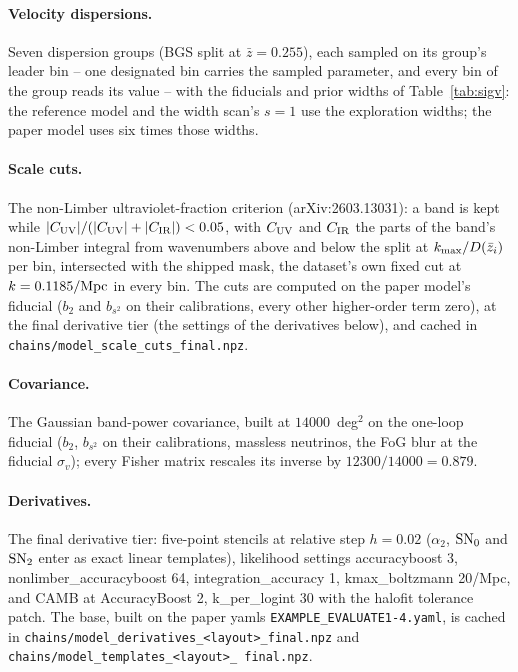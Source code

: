 \documentclass[11pt]{article}
\newcommand{\kmax}{k_{\rm max}}
\newcommand{\sv}{\sigma_v}
\newcommand{\us}{\_\allowbreak}
\begin{document}
\paragraph{Velocity dispersions.}
Seven dispersion groups (BGS split at $\bar{z} = 0.255$), each sampled
on its group's leader bin -- one designated bin carries the sampled
parameter, and every bin of the group reads its value -- with the
fiducials and prior widths of
Table~\ref{tab:sigv}: the reference model and the width scan's $s = 1$
use the exploration widths; the paper model uses six times those
widths.

\paragraph{Scale cuts.}
The non-Limber ultraviolet-fraction criterion (arXiv:2603.13031): a
band is kept while $|C_{\rm UV}|/(|C_{\rm UV}| + |C_{\rm IR}|) < 0.05$,
with $C_{\rm UV}$ and $C_{\rm IR}$ the parts of the band's non-Limber
integral from wavenumbers above and below the split at
$\kmax/D(\bar{z}_i)$ per bin, intersected with the shipped mask, the
dataset's own fixed cut at $k = 0.1185/{\rm Mpc}$ in every bin.  The cuts are computed on the paper model's fiducial
($b_2$ and $b_{s^2}$ on their calibrations, every other higher-order
term zero), at the final derivative tier (the settings of the
derivatives below), and cached in
\texttt{chains/model\us scale\us cuts\us final.npz}.

\paragraph{Covariance.}
The Gaussian band-power covariance, built at $14000$~deg$^2$ on the
one-loop fiducial ($b_2$, $b_{s^2}$ on their calibrations, massless
neutrinos, the FoG blur at the fiducial $\sv$); every Fisher matrix
rescales its inverse by $12300/14000 = 0.879$.

\paragraph{Derivatives.}
The final derivative tier: five-point stencils at relative step
$h = 0.02$ ($\alpha_2$, ${\rm SN}_0$ and ${\rm SN}_2$ enter as exact
linear templates), likelihood settings accuracyboost 3,
nonlimber\_accuracyboost 64, integration\_accuracy 1,
kmax\_boltzmann 20/Mpc, and CAMB at AccuracyBoost 2,
k\_per\_logint 30 with the halofit tolerance patch.  The base, built
on the paper yamls \texttt{EXAMPLE\us EVALUATE1-4.yaml}, is cached in
\texttt{chains/\allowbreak model\us derivatives\us<layout>\us final.npz}
and \texttt{chains/\allowbreak model\us templates\us<layout>\us
final.npz}.
\end{document}
